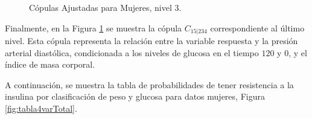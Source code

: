 \begin{figure}[H]
 \centering
    \caption{Cópulas Ajustadas para Mujeres, nivel $3$.}
    \label{fig:Modelo4TotalNivel4}
\end{figure}

Finalmente, en la Figura \ref{fig:Modelo4TotalNivel4} se muestra la cópula $C_{15|234}$ correspondiente al último nivel. Esta cópula representa la relación entre la variable respuesta y la presión arterial diastólica, condicionada a los niveles de glucosa en el tiempo $120$ y $0$, y el índice de masa corporal.

A continuación, se muestra la tabla de probabilidades de tener resistencia a la insulina por clasificación de peso y glucosa para datos mujeres, Figura \ref{fig:tabla4varTotal}.



